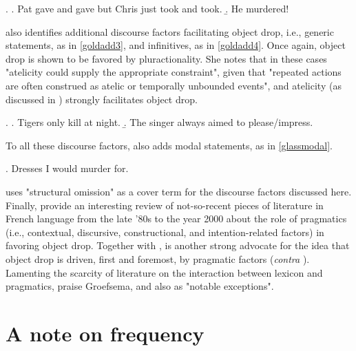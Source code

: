 \ex. \label{goldadd} \a. \label{goldadd1} Pat gave and gave but Chris just took and took.
\b. \label{goldadd2} He murdered!

\textcite[506-514]{Goldberg2001} also identifies additional discourse factors facilitating object drop, i.e., generic statements, as in \ref{goldadd3}, and infinitives, as in \ref{goldadd4}. Once again, object drop is shown to be favored by pluractionality. She notes \parencite[507]{Goldberg2001} that in these cases "atelicity could supply the appropriate constraint", given that "repeated actions are often construed as atelic or temporally unbounded events", and atelicity (as discussed in ) strongly facilitates object drop.

\ex. \label{goldaddB} \a. \label{goldadd3} Tigers only kill at night.
\b. \label{goldadd4} The singer always aimed to please/impress.

To all these discourse factors, \textcite[3]{Glass2020} also adds modal statements, as in \ref{glassmodal}.

\ex. \label{glassmodal} Dresses I would murder for.

\textcite[66]{Lorenzetti2008} uses "structural omission" as a cover term for the discourse factors discussed here. Finally, \textcite[46]{CumminsRoberge2005} provide an interesting review of not-so-recent pieces of literature in French language from the late '80s to the year 2000 about the role of pragmatics (i.e., contextual, discursive, constructional, and intention-related factors) in favoring object drop. Together with \textcite{Goldberg2001, Goldberg2005, Goldberg2005a, goldberg2006constructions}, \textcite{groefsema1995understood} is another strong advocate for the idea that object drop is driven, first and foremost, by pragmatic factors (\textit{contra} \textcite[29]{PethoKardos2006}). Lamenting the scarcity of literature on the interaction between lexicon and pragmatics, \textcite[7]{Garcia-VelascoMunoz2002} praise Groefsema, and also \textcite{Allerton1975, Fillmore1986, FellbaumKegl1989taxonomic} as "notable exceptions".


\section{A note on frequency} 


